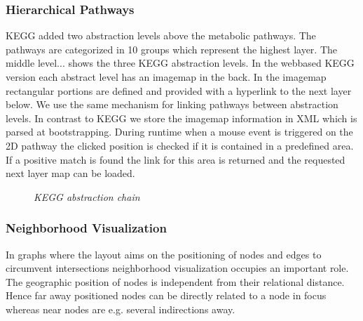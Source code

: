 \subsubsection{Hierarchical Pathways}

KEGG added two abstraction levels above the metabolic pathways. The pathways are categorized in 10 groups which represent the highest layer. The middle level...
 shows the three KEGG abstraction levels. 
In the webbased KEGG version each abstract level has an imagemap in the back. In the imagemap rectangular portions are defined and provided with a hyperlink to the next layer below. We use the same mechanism for linking pathways between abstraction levels. In contrast to KEGG we store the imagemap information in XML which is parsed at bootstrapping. During runtime when a mouse event is triggered on the 2D pathway the clicked position is checked if it is contained in a predefined area. If a positive match is found the link for this area is returned and the requested next layer map can be loaded.

\begin{figure}[ht]
\centering
{} 
\caption[KEGG abstraction chain]{\textit{KEGG abstraction chain}} 
\label{gfx:KEGG_abstraction_chain}
\end{figure}

\subsubsection{Neighborhood Visualization}

In graphs where the layout aims on the positioning of nodes and edges to circumvent intersections neighborhood visualization occupies an important role. The geographic position of nodes is independent from their relational distance. Hence far away positioned nodes can be directly related to a node in focus whereas near nodes are e.g. several indirections away. 


